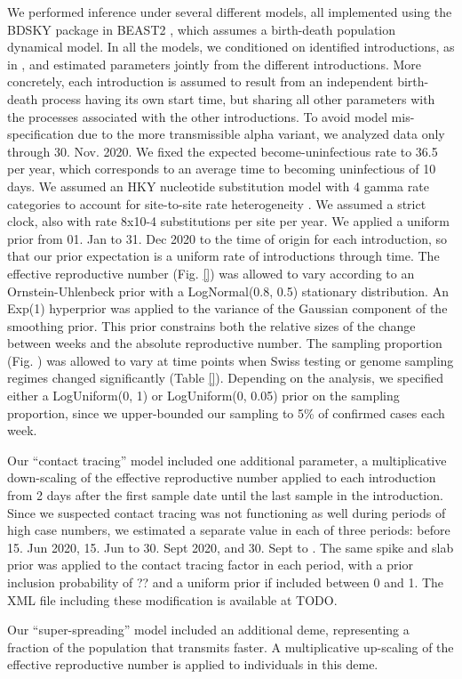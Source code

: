 \documentclass[9pt,twoside,lineno]{pnas-new} %
\begin{document}
{We performed inference under several different models, all implemented using the BDSKY package \cite{stadler2013birth} in BEAST2 \cite{Bouckaert2019}, which assumes a birth-death population dynamical model. In all the models, we conditioned on identified introductions, as in \cite{Muller2020}, and estimated parameters jointly from the different introductions. More concretely, each introduction is assumed to result from an independent birth-death process having its own start time, but sharing all other parameters with the processes associated with the other introductions. To avoid model mis-specification due to the more transmissible alpha variant, we analyzed data only through 30. Nov. 2020. We fixed the expected become-uninfectious rate to 36.5 per year, which corresponds to an average time to becoming uninfectious of 10 days. We assumed an HKY \cite{Hasegawa1985} nucleotide substitution model with 4 gamma rate categories to account for site-to-site rate heterogeneity \cite{Yang1994}. We assumed a strict clock, also with rate 8x10-4 substitutions per site per year. We applied a uniform prior from 01. Jan to 31. Dec 2020 to the time of origin for each introduction, so that our prior expectation is a uniform rate of introductions through time. The effective reproductive number (Fig. \ref{}) was allowed to vary according to an Ornstein-Uhlenbeck prior with a LogNormal(0.8, 0.5) stationary distribution. An Exp(1) hyperprior was applied to the variance of the Gaussian component of the smoothing prior. This prior constrains both the relative sizes of the change between weeks and the absolute reproductive number. The sampling proportion (Fig. ) was allowed to vary at time points when Swiss testing or genome sampling regimes changed significantly (Table \ref{}). Depending on the analysis, we specified either a LogUniform(0, 1) or LogUniform(0, 0.05) prior on the sampling proportion, since we upper-bounded our sampling to 5\% of confirmed cases each week.

Our ``contact tracing'' model included one additional parameter, a multiplicative down-scaling of the effective reproductive number applied to each introduction from 2 days after the first sample date until the last sample in the introduction. Since we suspected contact tracing was not functioning as well during periods of high case numbers, we estimated a separate value in each of three periods: before 15. Jun 2020, 15. Jun to 30. Sept 2020, and 30. Sept to \maxdate. The same spike and slab prior was applied to the contact tracing factor in each period, with a prior inclusion probability of ?? and a uniform prior if included between 0 and 1. The XML file including these modification is available at TODO.

Our ``super-spreading'' model included an additional deme, representing a fraction of the population that transmits faster. A multiplicative up-scaling of the effective reproductive number is applied to individuals in this deme.
}

\showmatmethods{} %


\showacknow{} %


\end{document}

